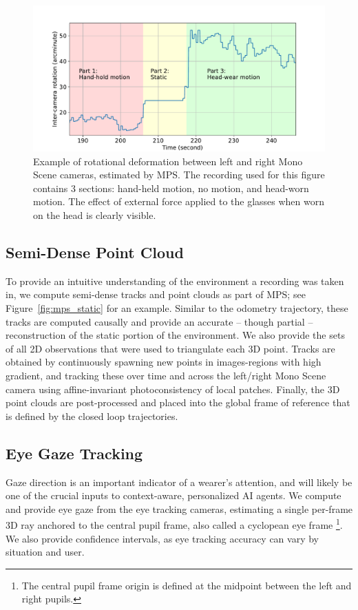\begin{figure}[tbp]
    \centering
    \includegraphics[width=\linewidth]{images/mps_online_calib.pdf}
    \caption{Example of rotational deformation between left and right Mono Scene cameras, estimated by MPS. The recording used for this figure contains 3 sections: hand-held motion, no motion, and head-worn motion. The effect of external force applied to the glasses when worn on the head is clearly visible.}
    \label{fig:mps_online_calib}
\end{figure}

\subsection{Semi-Dense Point Cloud}
\label{sec:semi-dense}
To provide an intuitive understanding of the environment a recording was taken in, we compute semi-dense tracks and point clouds as part of MPS; see Figure~\ref{fig:mps_static} for an example.  Similar to the odometry trajectory, these tracks are computed causally and provide an accurate -- though partial -- reconstruction of the static portion of the environment. We also provide the sets of all 2D observations that were used to triangulate each 3D point. Tracks are obtained by continuously spawning new points in images-regions with high gradient, and tracking these over time and across the left/right Mono Scene camera using affine-invariant photoconsistency of local patches. Finally, the 3D point clouds are post-processed and placed into the global frame of reference that is defined by the closed loop trajectories.

\subsection{Eye Gaze Tracking}

Gaze direction is an important indicator of a wearer's attention, and will likely be one of the crucial inputs to context-aware, personalized AI agents.
We compute and provide eye gaze from the \AriaDevice{} eye tracking cameras, estimating a single per-frame 3D ray anchored to the central pupil frame, also called a cyclopean eye frame \footnote{The central pupil frame origin is defined at the midpoint between the left and right pupils.}. We also provide confidence intervals, as eye tracking accuracy can vary by situation and user. 

